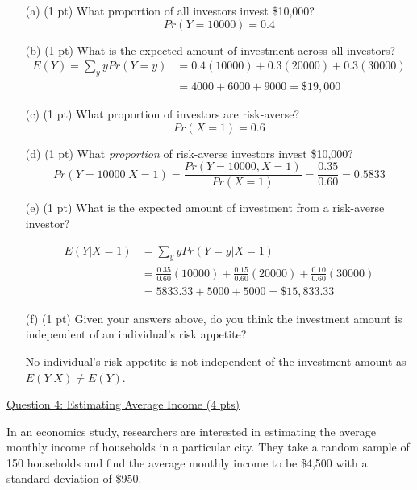 \documentclass{./../../../Latex/tests}
\begin{document}
\begin{enumerate}
\item[(a)] (1 pt) What proportion of all investors invest \$10,000?
$$ Pr(Y=10000) = 0.4  $$
\item[(b)] (1 pt) What is the expected amount of investment across all investors?
\begin{align*}
	E(Y) = \sum_y y Pr(Y=y) &= 0.4(10000) + 0.3(20000) + 0.3(30000) \\
	& = 4000 + 6000 + 9000 = \$ 19,000
\end{align*}

\item[(c)] (1 pt) What proportion of investors are risk-averse?
$$ Pr(X = 1) = 0.6 $$

\newpage
\item[(d)] (1 pt) What \textit{proportion} of risk-averse investors invest \$10,000?
$$ Pr(Y=10000|X=1) = \frac{Pr(Y=10000, X=1)}{Pr(X=1)} = \frac{0.35}{0.60} = 0.5833 $$

\item[(e)] (1 pt) What is the expected amount of investment from a risk-averse investor?

\begin{align*}
	E(Y|X=1) &= \sum_y y Pr(Y=y|X=1) \\
	&= \frac{0.35}{0.60}(10000) + \frac{0.15}{0.60}(20000) + \frac{0.10}{0.60}(30000) \\
	& = 5833.33 + 5000 + 5000 = \$ 15,833.33
\end{align*}
  
\item[(f)] (1 pt) Given your answers above, do you think the investment amount is independent of an individual's risk appetite?

No individual's risk appetite is not independent of the investment amount as $E(Y|X) \neq E(Y)$.
\end{enumerate}

\newpage
\underline{Question 4: Estimating Average Income (4 pts)}

In an economics study, researchers are interested in estimating the average monthly income of households in a particular city. They take a random sample of 150 households and find the average monthly income to be \$4,500 with a standard deviation of \$950.
\end{document}
